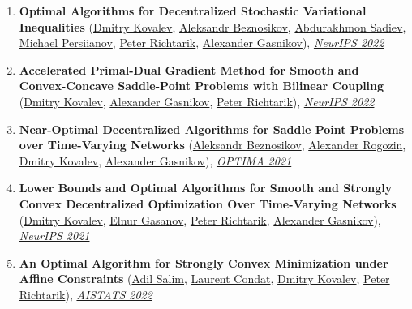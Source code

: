 \begin{enumerate}
\item \textbf{Optimal Algorithms for Decentralized Stochastic Variational Inequalities} (\href{https://www.dmitry-kovalev.com}{\color{linkcolour}Dmitry Kovalev}, \href{https://anbeznosikov.github.io}{\color{linkcolour}Aleksandr Beznosikov}, \href{https://scholar.google.com/citations?user=R-xZRIAAAAAJ&hl=ru}{\color{linkcolour}Abdurakhmon Sadiev}, \href{}{\color{linkcolour}Michael Persiianov}, \href{https://richtarik.org}{\color{linkcolour}Peter Richtarik}, \href{https://scholar.google.ru/citations?user=AmeE8qkAAAAJ}{\color{linkcolour}Alexander Gasnikov}), \href{https://nips.cc/Conferences/2022/Schedule?showEvent=55123}{\em \color{black}NeurIPS 2022}
\item \textbf{Accelerated Primal-Dual Gradient Method for Smooth and Convex-Concave Saddle-Point Problems with Bilinear Coupling} (\href{https://www.dmitry-kovalev.com}{\color{linkcolour}Dmitry Kovalev}, \href{https://scholar.google.ru/citations?user=AmeE8qkAAAAJ}{\color{linkcolour}Alexander Gasnikov}, \href{https://richtarik.org}{\color{linkcolour}Peter Richtarik}), \href{https://nips.cc/Conferences/2022/Schedule?showEvent=53383}{\em \color{black}NeurIPS 2022}
\item \textbf{Near-Optimal Decentralized Algorithms for Saddle Point Problems over Time-Varying Networks} (\href{https://anbeznosikov.github.io}{\color{linkcolour}Aleksandr Beznosikov}, \href{https://scholar.google.com/citations?user=sEjyzkgAAAAJ}{\color{linkcolour}Alexander Rogozin}, \href{https://www.dmitry-kovalev.com}{\color{linkcolour}Dmitry Kovalev}, \href{https://scholar.google.ru/citations?user=AmeE8qkAAAAJ}{\color{linkcolour}Alexander Gasnikov}), \href{https://link.springer.com/chapter/10.1007/978-3-030-91059-4_18}{\em \color{black}OPTIMA 2021}
\item \textbf{Lower Bounds and Optimal Algorithms for Smooth and Strongly Convex Decentralized Optimization Over Time-Varying Networks} (\href{https://www.dmitry-kovalev.com}{\color{linkcolour}Dmitry Kovalev}, \href{https://elnurgasanov.com}{\color{linkcolour}Elnur Gasanov}, \href{https://richtarik.org}{\color{linkcolour}Peter Richtarik}, \href{https://scholar.google.ru/citations?user=AmeE8qkAAAAJ}{\color{linkcolour}Alexander Gasnikov}), \href{https://proceedings.neurips.cc/paper/2021/hash/bc37e109d92bdc1ea71da6c919d54907-Abstract.html}{\em \color{black}NeurIPS 2021}
\item \textbf{An Optimal Algorithm for Strongly Convex Minimization under Affine Constraints} (\href{https://adil-salim.github.io}{\color{linkcolour}Adil Salim}, \href{https://lcondat.github.io}{\color{linkcolour}Laurent Condat}, \href{https://www.dmitry-kovalev.com}{\color{linkcolour}Dmitry Kovalev}, \href{https://richtarik.org}{\color{linkcolour}Peter Richtarik}), \href{http://aistats.org/aistats2022/accepted.html}{\em \color{black}AISTATS 2022}

\end{enumerate}
